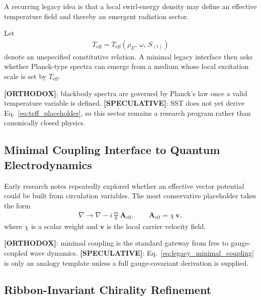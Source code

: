 \documentclass[11pt]{article}
\theoremstyle{definition}
\theoremstyle{plain}
\theoremstyle{remark}
\begin{document}
        A recurring legacy idea is that a local swirl-energy density may define an effective temperature field and thereby an emergent radiation sector.

        Let
        \begin{align}
            T_{\mathrm{eff}} = T_{\mathrm{eff}}\!\left(\rho_E,\,\omega,\,S_{(t)}\right)
            \label{eq:teff_placeholder}
        \end{align}
        denote an unspecified constitutive relation. A minimal legacy interface then asks whether Planck-type spectra can emerge from a medium whose local excitation scale is set by $T_{\mathrm{eff}}$.

        \textbf{[ORTHODOX]}: blackbody spectra are governed by Planck's law once a valid temperature variable is defined.\newline
        \textbf{[SPECULATIVE]}: SST does not yet derive Eq.~\eqref{eq:teff_placeholder}, so this sector remains a research program rather than canonically closed physics.

    \subsection{Minimal Coupling Interface to Quantum Electrodynamics}

        Early research notes repeatedly explored whether an effective vector potential could be built from circulation variables. The most conservative placeholder takes the form
        \begin{align}
            \nabla \rightarrow \nabla - i\,\frac{m}{\hbar}\,\mathbf{A}_{\mathrm{eff}},
            \qquad
            \mathbf{A}_{\mathrm{eff}} = \chi\,\mathbf{v},
            \label{eq:legacy_minimal_coupling}
        \end{align}
        where $\chi$ is a scalar weight and $\mathbf{v}$ is the local carrier velocity field.

        \textbf{[ORTHODOX]}: minimal coupling is the standard gateway from free to gauge-coupled wave dynamics.\newline
        \textbf{[SPECULATIVE]}: Eq.~\eqref{eq:legacy_minimal_coupling} is only an analogy template unless a full gauge-covariant derivation is supplied.

    \subsection{Ribbon-Invariant Chirality Refinement}
\end{document}
